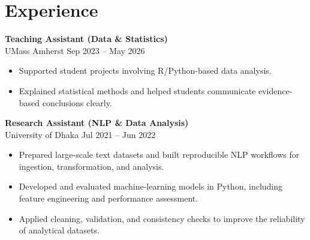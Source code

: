 \documentclass[10pt, letterpaper]{article}
\begin{document}




    \section*{Experience}
    \textbf{Teaching Assistant (Data \& Statistics)} \\
UMass Amherst \hfill Sep 2023 -- May 2026
\begin{itemize}
    \item Supported student projects involving R/Python-based data analysis.
    \item Explained statistical methods and helped students communicate evidence-based conclusions clearly.
\end{itemize}

   \textbf{Research Assistant (NLP \& Data Analysis)} \\
   University of Dhaka \hfill Jul 2021 -- Jun 2022
   \begin{itemize}
    \item Prepared large-scale text datasets and built reproducible NLP workflows for ingestion, transformation, and analysis.
    \item Developed and evaluated machine-learning models in Python, including feature engineering and performance assessment.
    \item Applied cleaning, validation, and consistency checks to improve the reliability of analytical datasets.
\end{itemize}
\end{document}
